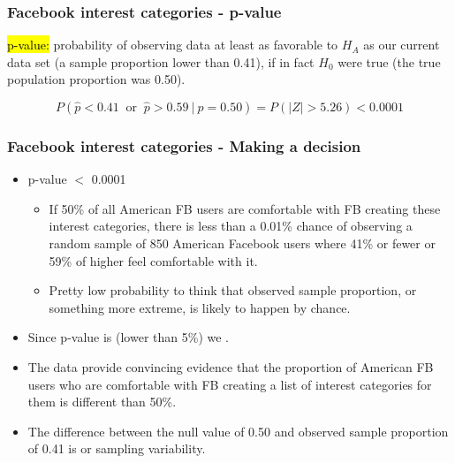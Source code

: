 
\begin{frame}
\frametitle{Facebook interest categories - p-value}

\hl{p-value:} probability of observing data at least as favorable to $H_A$ as our current data set (a sample proportion lower than 0.41), if in fact $H_0$ were true (the true population proportion was 0.50).

\pause

\[ P(\hat{p} < 0.41~\text{ or }~\hat{p} > 0.59~|~p = 0.50) = P(|Z| > 5.26) < 0.0001 \]

\end{frame}


\begin{frame}
\frametitle{Facebook interest categories - Making a decision}
\vspace{-1em}
\begin{itemize}

\item p-value $<$ 0.0001

\pause

\begin{itemize}
\item If 50\% of all American FB users are comfortable with FB creating these interest categories, there is less than a 0.01\% chance of observing a random sample of 850 American Facebook users where 41\% or fewer or 59\% of higher feel comfortable with it.
\pause
\item Pretty low probability to think that observed sample proportion, or something more extreme, is likely to happen by chance.
\end{itemize}

\pause
\item Since p-value is  (lower than 5\%) we .

\pause
\item The data provide convincing evidence that the proportion of American FB users who are comfortable with FB creating a list of interest categories for them is different than 50\%.

\pause
\item The difference between the null value of 0.50 and observed sample proportion of 0.41 is  or sampling variability.

\end{itemize}

\end{frame}

